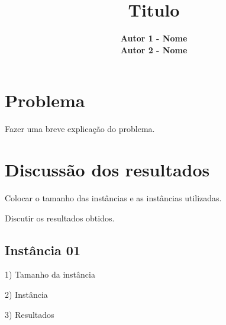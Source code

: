 \documentclass[a4paper,11pt]{article}
\title{Titulo}
\author{\textbf{Autor 1 - Nome}\\\textbf{Autor 2 - Nome}}
\date{\empty}
\begin{document}
\maketitle
\thispagestyle{empty}

\section{Problema}

Fazer uma breve explicação do problema.

\section{Discussão dos resultados}

Colocar o tamanho das instâncias e as instâncias utilizadas.

Discutir os resultados obtidos.

\subsection{Instância 01}

1) Tamanho da instância

2) Instância

3) Resultados

\newpage

\label{bibliografia}

\end{document}
